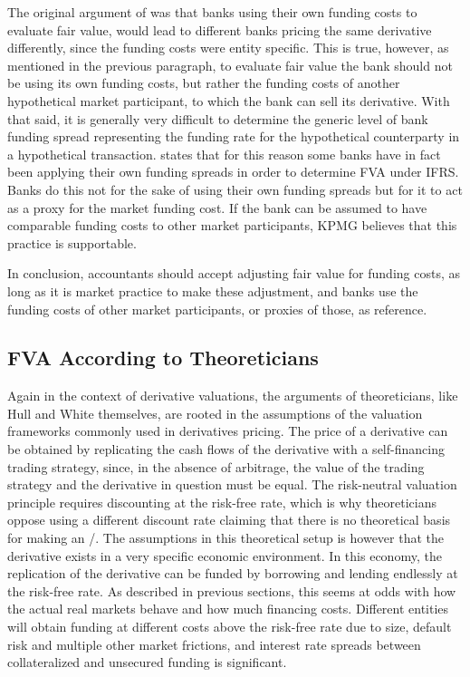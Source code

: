 \documentclass[main.tex]{subfiles}
\begin{document}
            The original argument of \textcite{HullWhiteFVA} was that banks using their own funding costs to evaluate fair value,
            would lead to different banks pricing the same derivative differently,
            since the funding costs were entity specific.
            This is true, however, as mentioned in the previous paragraph,
            to evaluate fair value the bank should not be using its own funding costs, 
            but rather the funding costs of another hypothetical market participant, 
            to which the bank can sell its derivative.
            With that said, it is generally very difficult to determine the generic level of bank funding spread
            representing the funding rate for the hypothetical counterparty in a hypothetical transaction.
            \textcite[Proposition 4]{KPMGFVA} states that for this reason 
            some banks have in fact been applying their own funding spreads in order to determine FVA under IFRS. 
            Banks do this not for the sake of using their own funding spreads
            but for it to act as a proxy for the market funding cost.
            If the bank can be assumed to have comparable funding costs to other market participants,
            KPMG believes that this practice is supportable.

            In conclusion, accountants should accept adjusting fair value for funding costs,
            as long as it is market practice to make these adjustment,
            and banks use the funding costs of other market participants, or proxies of those, as reference.

        \subsection{FVA According to Theoreticians}
            Again in the context of derivative valuations, 
            the arguments of theoreticians, like Hull and White themselves, 
            are rooted in the assumptions of the valuation frameworks commonly used in derivatives pricing.
            The price of a derivative can be obtained by replicating the cash flows of the derivative 
            with a self-financing trading strategy, since, in the absence of arbitrage, 
            the value of the trading strategy and the derivative in question must be equal.
            The risk-neutral valuation principle requires discounting at the risk-free rate,
            which is why theoreticians oppose using a different discount rate
            claiming that there is no theoretical basis for making an \FVA/.
            The assumptions in this theoretical setup is however 
            that the derivative exists in a very specific economic environment. 
            In this economy, the replication of the derivative
            can be funded by borrowing and lending endlessly at the risk-free rate.
            As described in previous sections,
            this seems at odds with how the actual real markets behave and how much financing costs.
            Different entities will obtain funding at different costs above the risk-free rate due to size,
            default risk and multiple other market frictions,
            and interest rate spreads between collateralized and unsecured funding is significant.
\end{document}
